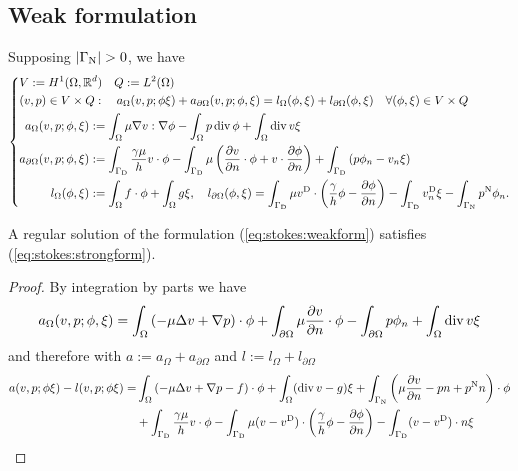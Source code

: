 \subsection{Weak formulation}\label{subsec:}
%
Supposing $\abs{\GammaN}>0$, we have
%
\begin{equation}\label{eq:stokes:weakform}
%
\left\{
\begin{aligned}
&V :=  H^1(\Omega,\R^d)\quad Q := L^2(\Omega)\\
&(v,p)\in V\times Q:\quad a_{\Omega}(v,p; \phi\xi) + a_{\partial\Omega}(v,p; \phi,\xi) = l_{\Omega}(\phi,\xi)+l_{\partial\Omega}(\phi,\xi) \quad\forall (\phi,\xi)\in V\times Q\\
&\begin{aligned}
a_{\Omega}(v,p; \phi,\xi) &:= \int_{\Omega} \mu \nabla v:\nabla\phi - \int_{\Omega}p \div \phi + \int_{\Omega} \div v \xi\\
 a_{\partial\Omega}(v,p; \phi,\xi) &:= \int_{\GammaD}\frac{\gamma\mu}{h}v\cdot\phi - 
 \int_{\GammaD}\mu \left(  \dn{v}\cdot  \phi + v  \cdot \dn{\phi}\right) 
 + \int_{\GammaD} \left( p \phi_n - v_n \xi\right)\\
 l_{\Omega}(\phi,\xi) &:= \int_{\Omega} f\cdot\phi + \int_{\Omega} g\xi, \quad
 l_{\partial\Omega}(\phi,\xi) = \int_{\GammaD}\mu\vD\cdot\left( \frac{\gamma}{h}\phi - \dn{\phi}\right)- \int_{\GammaD}\vD_n\xi
 - \int_{\GammaN} \pN \phi_n.
\end{aligned}
\end{aligned}
\right.
%
\end{equation}
%
\begin{lemma}\label{lemma:}
A regular solution of the formulation (\ref{eq:stokes:weakform}) satisfies (\ref{eq:stokes:strongform}).
\end{lemma}
%
\begin{proof}
By integration by parts we have
%
\begin{align*}
a_{\Omega}(v,p; \phi,\xi) = \int_{\Omega} \left( -\mu \Delta v+\nabla p\right)\cdot\phi + 
\int_{\partial\Omega} \mu\frac{\partial v}{\partial n}\cdot\phi - \int_{\partial\Omega} p\phi_n
+\int_{\Omega} \operatorname{div} v \xi
\end{align*}
%
and therefore with $a:=a_{\Omega}+a_{\partial\Omega}$ and $l:=l_{\Omega}+l_{\partial\Omega}$
%
\begin{align*}
a(v,p; \phi\xi) - l(v,p; \phi\xi) =& 
\int_{\Omega} \left( -\mu \Delta v+\nabla p -f \right)\cdot\phi + \int_{\Omega} (\operatorname{div} v -g)\xi
+ \int_{\Gamma_{\rm N}} \left(\mu\frac{\partial v}{\partial n}-p n + p^{\rm N} n\right)\cdot\phi\\
&+  \int_{\Gamma_{\rm D}}\frac{\gamma\mu}{h}v\cdot\phi - 
 \int_{\Gamma_{\rm D}}\mu(v-v^{\rm D})\cdot\left( \frac{\gamma}{h}\phi - \frac{\partial \phi}{\partial n}\right)
 - \int_{\Gamma_{\rm D}} (v-v^{\rm D})\cdot n\xi
\end{align*}
%


\end{proof}
%



